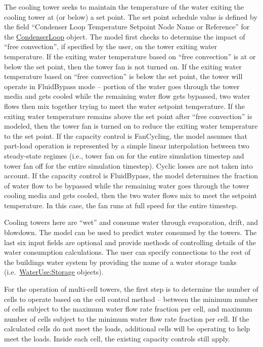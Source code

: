 The cooling tower seeks to maintain the temperature of the water exiting the cooling tower at (or below) a set point. The set point schedule value is defined by the field ``Condenser Loop Temperature Setpoint Node Name or Reference'' for the \hyperref[condenserloop]{CondenserLoop} object. The model first checks to determine the impact of ``free convection'', if specified by the user, on the tower exiting water temperature. If the exiting water temperature based on ``free convection'' is at or below the set point, then the tower fan is not turned on. If the exiting water temperature based on ``free convection'' is below the set point, the tower will operate in FluidBypass mode -- portion of the water goes through the tower media and gets cooled while the remaining water flow gets bypassed, two water flows then mix together trying to meet the water setpoint temperature. If the exiting water temperature remains above the set point after ``free convection'' is modeled, then the tower fan is turned on to reduce the exiting water temperature to the set point. If the capacity control is FanCycling, the model assumes that part-load operation is represented by a simple linear interpolation between two steady-state regimes (i.e., tower fan on for the entire simulation timestep and tower fan off for the entire simulation timestep). Cyclic losses are not taken into account. If the capacity control is FluidBypass, the model determines the fraction of water flow to be bypassed while the remaining water goes through the tower cooling media and gets cooled, then the two water flows mix to meet the setpoint temperature. In this case, the fan runs at full speed for the entire timestep.

Cooling towers here are ``wet'' and consume water through evaporation, drift, and blowdown. The model can be used to predict water consumed by the towers. The last six input fields are optional and provide methods of controlling details of the water consumption calculations. The user can specify connections to the rest of the buildings water system by providing the name of a water storage tanks (i.e.~\hyperref[waterusestorage]{WaterUse:Storage} objects).

For the operation of multi-cell towers, the first step is to determine the number of cells to operate based on the cell control method -- between the minimum number of cells subject to the maximum water flow rate fraction per cell, and maximum number of cells subject to the minimum water flow rate fraction per cell. If the calculated cells do not meet the loads, additional cells will be operating to help meet the loads. Inside each cell, the existing capacity controls still apply.

